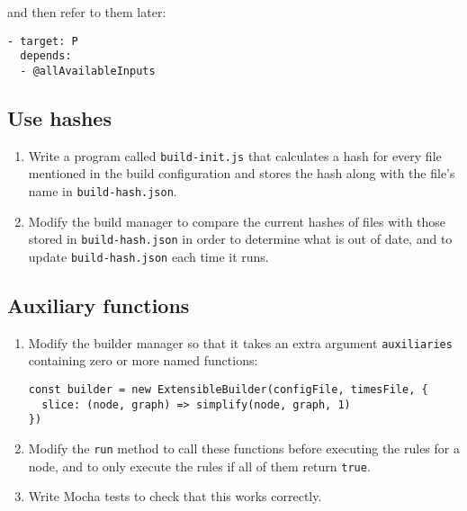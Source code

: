 \documentclass[krantzl]{krantz}
\begin{document}
\noindent and then refer to them later:

\begin{lstlisting}[frame=tblr]
- target: P
  depends:
  - @allAvailableInputs
\end{lstlisting}

\subsection*{Use hashes}

\begin{enumerate}

\item 

Write a program called \texttt{build-init.js} that calculates a hash
    for every file mentioned in the build configuration
    and stores the hash along with the file’s name in \texttt{build-hash.json}.



\item 

Modify the build manager to compare the current hashes of files
    with those stored in \texttt{build-hash.json}
    in order to determine what is out of date,
    and to update \texttt{build-hash.json} each time it runs.



\end{enumerate}

\subsection*{Auxiliary functions}

\begin{enumerate}

\item 

Modify the builder manager so that it takes an extra argument \texttt{auxiliaries}
    containing zero or more named functions:

\begin{lstlisting}[frame=tblr]
const builder = new ExtensibleBuilder(configFile, timesFile, {
  slice: (node, graph) => simplify(node, graph, 1)
})
\end{lstlisting}



\item 

Modify the \texttt{run} method to call these functions
    before executing the rules for a node,
    and to only execute the rules if all of them return \texttt{true}.



\item 

Write Mocha tests to check that this works correctly.



\end{enumerate}
\end{document}
